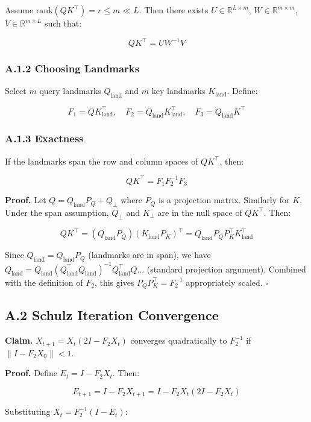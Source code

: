 Assume $\text{rank}(QK^\top) = r \le m \ll L$. Then there exists 
$U \in \mathbb{R}^{L \times m}$, $W \in \mathbb{R}^{m \times m}$, 
$V \in \mathbb{R}^{m \times L}$ such that:

\[
QK^\top = U W^{-1} V
\]

\subsubsection{A.1.2 Choosing Landmarks}

Select $m$ query landmarks $Q_\text{land}$ and $m$ key landmarks $K_\text{land}$. 
Define:

\[
F_1 = Q K_\text{land}^\top, \quad
F_2 = Q_\text{land} K_\text{land}^\top, \quad
F_3 = Q_\text{land} K^\top
\]

\subsubsection{A.1.3 Exactness}

If the landmarks span the row and column spaces of $QK^\top$, then:

\[
Q K^\top = F_1 F_2^{-1} F_3
\]

\textbf{Proof.} Let $Q = Q_\text{land} P_Q + Q_\perp$ where $P_Q$ is a 
projection matrix. Similarly for $K$. Under the span assumption, 
$Q_\perp$ and $K_\perp$ are in the null space of $QK^\top$. Then:

\[
QK^\top = (Q_\text{land} P_Q)(K_\text{land} P_K)^\top = Q_\text{land} P_Q P_K^\top K_\text{land}^\top
\]

Since $Q_\text{land} = Q_\text{land} P_Q$ (landmarks are in span), we have 
$Q_\text{land} = Q_\text{land} (Q_\text{land}^\top Q_\text{land})^{-1} Q_\text{land}^\top Q$... 
(standard projection argument). Combined with the definition of $F_2$, this 
gives $P_Q P_K^\top = F_2^{-1}$ appropriately scaled. $\square$

\subsection{A.2 Schulz Iteration Convergence}

\textbf{Claim.} $X_{t+1} = X_t (2I - F_2 X_t)$ converges quadratically to $F_2^{-1}$ 
if $\|I - F_2 X_0\| < 1$.

\textbf{Proof.} Define $E_t = I - F_2 X_t$. Then:

\[
E_{t+1} = I - F_2 X_{t+1} = I - F_2 X_t (2I - F_2 X_t)
\]

Substituting $X_t = F_2^{-1}(I - E_t)$:

